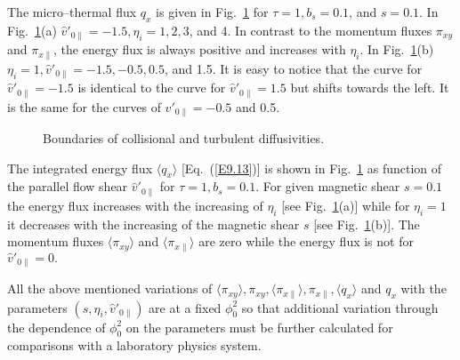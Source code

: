 \documentclass[a4paper,openany,12pt]{book}
\def\chix{\raise.5ex\hbox{$\chi$}}
\def\nms{\mathsurround=0pt}
\def\gtsim{\mathrel{\mathpalette\oversim>}} %
\def\ltsim{\mathrel{\mathpalette\oversim<}} %
\def\oversim#1#2{\lower 2pt\vbox{\baselineskip 0pt \lineskip 1pt
    \ialign{$\nms#1\hfil##\hfil$\crcr#2\crcr\sim\crcr}}}
\begin{document}
{The micro--thermal flux $q_x$ is given in Fig.~\ref{F9.42} for $\tau=1, b_s=0.1$, and 
$s=0.1$. In Fig.~\ref{F9.42}(a) $\widehat v'_{0\|}=-1.5, \eta_i=1,2,3$, and 4. In contrast to the momentum fluxes $\pi_{xy}$ and $\pi_{x\|}$, the energy flux is always positive and increases with 
$\eta_i$. In Fig.~\ref{F9.42}(b) $\eta_i=1, \widehat v'_{0\|}=-1.5, -0.5,0.5$, and 1.5. It is easy to notice that the curve for $\widehat v'_{0\|}=-1.5$ is identical to the curve for $\widehat v'_{0\|}=1.5$ but shifts towards the left. It is the same for the curves of $\widehat v'_{0\|}=-0.5$ and 0.5.
\begin{figure}[H]
\centerline{}%
\centerline{}%
\caption{Boundaries of collisional and turbulent diffusivities.}
\label{F9.42}
\end{figure}
%
The integrated energy flux $\langle q_x\rangle$ [Eq.~(\ref{E9.13})] is shown in Fig.~\ref{F9.42} as function of the parallel flow shear $\widehat v'_{0\|}$ for $\tau=1, b_s=0.1$. For given magnetic shear $s=0.1$ the energy flux increases with the increasing of $\eta_i$ [see Fig.~\ref{F9.42}(a)] while for $\eta_i=1$ it decreases with the increasing of the magnetic shear $s$ [see Fig.~\ref{F9.42}(b)]. The momentum fluxes $\langle\pi_{xy}\rangle$ and $\langle\pi_{x\|}\rangle$ are zero while the energy flux is not for $\widehat v'_{0\|}=0.$

All the above mentioned variations of $\langle\pi_{xy}\rangle, \pi_{xy}, \langle\pi_{x\|}\rangle, \pi_{x\|}, \langle q_x\rangle$ and $q_x$ with the parameters $(s, \eta_i,\widehat v'_{0\|})$ are at a fixed $\phi_0^2$ so that additional variation through the dependence of $\phi_0^2$ on the parameters must be further calculated for comparisons with a laboratory physics system.

%

}
\end{document}
